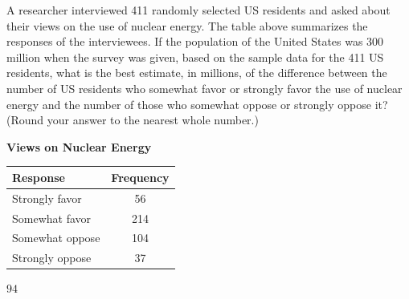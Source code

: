 \newpage


\question[1]
A researcher interviewed 411 randomly selected US residents and asked about their views on the use of nuclear energy. The table above summarizes the responses of the interviewees. If the population of the United States was 300 million when the survey was given, based on the sample data for the 411 US residents, what is the best estimate, in millions, of the difference between the number of US residents who somewhat favor or strongly favor the use of nuclear energy and the number of those who somewhat oppose or strongly oppose it? (Round your answer to the nearest whole number.)
\vspace{0.5em}
\begin{center}
  \renewcommand{\arraystretch}{1.3} 
  \setlength{\tabcolsep}{0.5em}
  {\textbf{Views on Nuclear Energy}\par}
  \vspace{0.35em}
  \begin{tabular}{|l|c|}
    \hline
    \rowcolor[HTML]{E0E0E0}
    \textbf{Response} & \textbf{Frequency} \\
    \hline
    Strongly favor    & 56  \\
    Somewhat favor    & 214 \\
    Somewhat oppose   & 104 \\
    Strongly oppose   & 37  \\
    \hline
  \end{tabular}
\end{center}
\begin{solutionorbox}[1.25in]
  $94$
\end{solutionorbox}

\newpage

